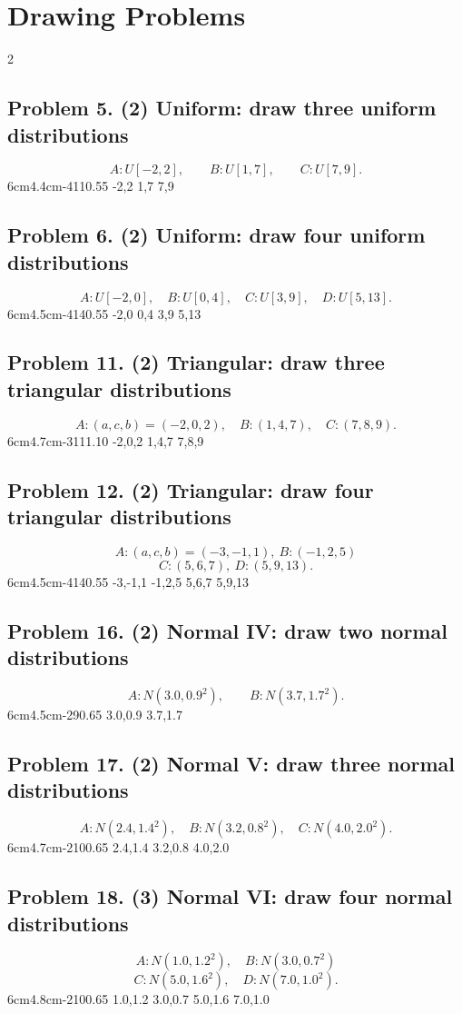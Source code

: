 \section{Drawing Problems}
\begin{multicols}{2}

\subsection*{Problem 5. (2) Uniform: draw three uniform distributions}
\[
A:U[-2,2],\qquad B:U[1,7],\qquad C:U[7,9].
\]
\UniformThreeGraph
{6cm}{4.4cm}{-4}{11}{0.55}
{-2,2}
{1,7}
{7,9}

\subsection*{Problem 6. (2) Uniform: draw four uniform distributions}
\[
A:U[-2,0],\quad B:U[0,4],\quad C:U[3,9],\quad D:U[5,13].
\]
\UniformFourGraph
{6cm}{4.5cm}{-4}{14}{0.55}
{-2,0}
{0,4}
{3,9}
{5,13}

\subsection*{Problem 11. (2) Triangular: draw three triangular distributions}
\[
A:(a,c,b)=(-2,0,2),\quad B:(1,4,7),\quad C:(7,8,9).
\]
\TriangularThreeGraph
{6cm}{4.7cm}{-3}{11}{1.10}
{-2,0,2}
{1,4,7}
{7,8,9}

\subsection*{Problem 12. (2) Triangular: draw four triangular distributions}
\[
A:(a,c,b)=(-3,-1,1),\ B:(-1,2,5)
\]
\[ C:(5,6,7),\ D:(5,9,13).
\]
\TriangularFourGraph
{6cm}{4.5cm}{-4}{14}{0.55}
{-3,-1,1}
{-1,2,5}
{5,6,7}
{5,9,13}

\subsection*{Problem 16. (2) Normal IV: draw two normal distributions}
\[
A:N(3.0,0.9^2),\qquad B:N(3.7,1.7^2).
\]
\NormalTwoGraph
{6cm}{4.5cm}{-2}{9}{0.65}
{3.0,0.9}
{3.7,1.7}

\vspace{7cm}

\subsection*{Problem 17. (2) Normal V: draw three normal distributions}
\[
A:N(2.4,1.4^2),\quad B:N(3.2,0.8^2),\quad C:N(4.0,2.0^2).
\]
\NormalThreeGraph
{6cm}{4.7cm}{-2}{10}{0.65}
{2.4,1.4}
{3.2,0.8}
{4.0,2.0}

\subsection*{Problem 18. (3) Normal VI: draw four normal distributions}
\[
A:N(1.0,1.2^2),\quad B:N(3.0,0.7^2)
 \]
\[
 C:N(5.0,1.6^2),\quad D:N(7.0,1.0^2).
\]
\NormalFourGraph
{6cm}{4.8cm}{-2}{10}{0.65}
{1.0,1.2}
{3.0,0.7}
{5.0,1.6}
{7.0,1.0}

\end{multicols}

